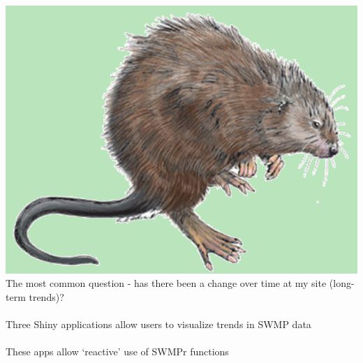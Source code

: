 \documentclass[serif]{beamer}\usepackage[]{graphicx}\usepackage[]{color}
\begin{document}
\begin{frame}[fragile]{\includegraphics[width=0.05\paperwidth]{fig/muskrat.png}\hspace{0.07in}{\bf SWMPrats.net: Widgets}}
The most common question - has there been a change over time at my site (long-term trends)? \\~\\
Three Shiny applications allow users to visualize trends in SWMP data \\~\\
These apps allow `reactive' use of SWMPr functions \\~\\
\begin{columns}
\begin{column}{0.3\textwidth}
\centerline{}

\end{column}
\end{columns}
\end{frame}
\end{document}
